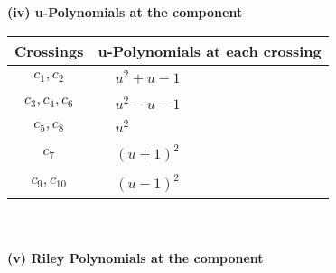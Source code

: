 \documentclass[1p]{elsarticle_modified}
\theoremstyle{definition}
\begin{document}
\newpage\renewcommand{\arraystretch}{1}
\flushleft \textbf{(iv) u-Polynomials at the component}\newline \\
\begin{tabular}{m{50pt}|m{274pt}}
Crossings & \hspace{64pt}u-Polynomials at each crossing \\
\hline $$\begin{aligned}c_{1},c_{2}\end{aligned}$$&$\begin{aligned}
&u^2+u-1
\end{aligned}$\\
\hline $$\begin{aligned}c_{3},c_{4},c_{6}\end{aligned}$$&$\begin{aligned}
&u^2- u-1
\end{aligned}$\\
\hline $$\begin{aligned}c_{5},c_{8}\end{aligned}$$&$\begin{aligned}
&u^2
\end{aligned}$\\
\hline $$\begin{aligned}c_{7}\end{aligned}$$&$\begin{aligned}
&(u+1)^2
\end{aligned}$\\
\hline $$\begin{aligned}c_{9},c_{10}\end{aligned}$$&$\begin{aligned}
&(u-1)^2
\end{aligned}$\\
\hline
\end{tabular}\\~\\
\newpage\renewcommand{\arraystretch}{1}
\flushleft \textbf{(v) Riley Polynomials at the component}\newline \\
\end{document}
